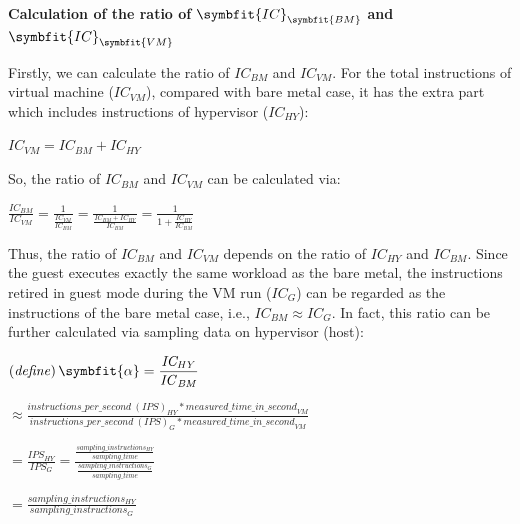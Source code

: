 \documentclass[12pt]{article}
\newcommand{\npar}[1]{#1\par}
\newcommand{\dmath}[1]{{\centering $\displaystyle #1$\par}}
\newcommand{\emptypar}{\mbox{}\par}
\newcommand{\numpara}[4]{{\hangindent=#1\relax\hangafter=1\relax
  \noindent\hspace*{\dimexpr#1-#2\relax}\makebox[#2][l]{#3}#4\par}}
\begin{document}
\emptypar
\numpara{18.00pt}{18.00pt}{\textbf{(1)}}{\textbf{Calculation of the ratio of }${\symbfit{IC}}_{\symbfit{BM}}$\textbf{ and }${\symbfit{IC}}_{\symbfit{VM}}$}
\npar{\hspace*{4\fontdimen2\font}Firstly, we can calculate the ratio of ${\mathit{IC}}_{\mathit{BM}}$ and ${\mathit{IC}}_{\mathit{VM}}$. For the total instructions of virtual machine ($\mathit{I}{\mathit{C}}_{\mathit{VM}}$), compared with bare metal case, it has the extra part which includes instructions of hypervisor ($\mathit{I}{\mathit{C}}_{\mathit{HY}}$):}
\dmath{\mathit{I}{\mathit{C}}_{\mathit{VM}}=\mathit{I}{\mathit{C}}_{\mathit{BM}}+\mathit{I}{\mathit{C}}_{\mathit{HY}}}
\npar{\hspace*{4\fontdimen2\font}So, the ratio of ${\mathit{IC}}_{\mathit{BM}}$ and ${\mathit{IC}}_{\mathit{VM}}$ can be calculated via:}
\dmath{\frac{{\mathit{IC}}_{\mathit{BM}}}{{\mathit{IC}}_{\mathit{VM}}}=\frac{1}{\frac{{\mathit{IC}}_{\mathit{VM}}}{{\mathit{IC}}_{\mathit{BM}}}}=\frac{1}{\frac{{\mathit{IC}}_{\mathit{BM}}+\mathit{I}{\mathit{C}}_{\mathit{HY}}}{{\mathit{IC}}_{\mathit{BM}}}}=\frac{1}{1+\frac{\mathit{I}{\mathit{C}}_{\mathit{HY}}}{{\mathit{IC}}_{\mathit{BM}}}}}
\emptypar
\npar{\hspace*{4\fontdimen2\font}Thus, the ratio of ${\mathit{IC}}_{\mathit{BM}}$ and ${\mathit{IC}}_{\mathit{VM}}$ depends on the ratio of ${\mathit{IC}}_{\mathit{HY}}$ and ${\mathit{IC}}_{\mathit{BM}}$. Since the guest executes exactly the same workload as the bare metal, the instructions retired in guest mode during the VM run (${\mathit{IC}}_{\mathit{G}}$) can be regarded as the instructions of the bare metal case, i.e., ${\mathit{IC}}_{\mathit{BM}}\approx {\mathit{IC}}_{\mathit{G}}$. In fact, this ratio can be further calculated via sampling data on hypervisor (host):}
\dmath{\left( \mathit{define} \right)\symbfit{\alpha}=\frac{\mathit{I}{\mathit{C}}_{\mathit{HY}}}{{\mathit{IC}}_{\mathit{BM}}}}
\dmath{\approx \frac{{\mathit{instructions\_per\_second}\ (\mathit{IPS})}_{\mathit{HY}}*{\mathit{measured\_time\_in\_second}}_{\mathit{VM}}}{{\mathit{instructions\_per\_second}\ (\mathit{IPS})}_{\mathit{G}}*{\mathit{measured\_time\_in\_second}}_{\mathit{VM}}}}
\dmath{=\frac{\mathit{I}{\mathit{PS}}_{\mathit{HY}}}{\mathit{I}{\mathit{PS}}_{\mathit{G}}}=\frac{\frac{\mathit{sampling\_}{\mathit{instructions}}_{\mathit{HY}}}{\mathit{sampling\_time}}}{\frac{\mathit{sampling\_}{\mathit{instructions}}_{\mathit{G}}}{\mathit{sampling\_time}}}}
\dmath{=\frac{\mathit{sampling\_}{\mathit{instructions}}_{\mathit{HY}}}{\mathit{sampling\_}{\mathit{instructions}}_{\mathit{G}}}}
\end{document}
